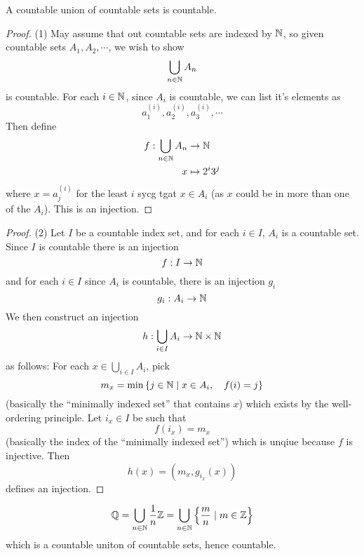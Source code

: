 \documentclass{article}
\begin{document}
\begin{nthm}\label{th:5-6}
    A countable union of countable sets is countable.
\end{nthm}
\begin{proof} (1)
    May assume that out countable sets are indexed by $\mathbb{N}$,
    so given countable sets $A_1, A_2, \cdots$, we wish to show
    \[
        \bigcup_{n \in \mathbb{N}} A_n  
    \]
    is countable.
    For each $i \in \mathbb{N}$, since $A_i$ is countable, we can list it's elements as
    \[
        a_1^{(i)}, a_2^{(i)}, a_3^{(i)}, \cdots  
    \]
    Then define 
    \begin{align*}
        f : \bigcup_{n \in \mathbb{N}} A_n & \rightarrow \mathbb{N} \\
        x &\mapsto 2^i 3^j
    \end{align*}
    where $x = a_j^{(i)}$ for the least $i$ sycg tgat $x \in A_i$ (as $x$ could be in more than one of the $A_i$). This is an injection.
\end{proof}
\begin{proof} (2)
    Let $I$ be a countable index set, and for each $i \in I$, $A_i$ is a countable set.
    Since $I$ is countable there is an injection
    \[
        f: I \rightarrow \mathbb{N}  
    \]
    and for each $i \in I$ since $A_i$ is countable, there is an injection $g_i$
    \[
        g_i: A_i \rightarrow \mathbb{N}  
    \]
    We then construct an injection
    \[
        h: \bigcup_{i \in I} A_i \rightarrow \mathbb{N} \times \mathbb{N}
    \]
    as follows:
    For each $x \in \bigcup_{i \in I} A_i$, pick 
    \[
        m_x = \min \left\{ j \in \mathbb{N} \mid x \in A_i, \quad f(i) = j \right\}  
    \]
    (basically the ``minimally indexed set'' that contains $x$) which exists by the well-ordering principle.
    Let $i_x \in I$ be such that 
    \[
        f(i_x) = m_x  
    \]
    (basically the index of the ``minimally indexed set'') which is unqiue because $f$ is injective.
    Then
    \[
        h(x) = (m_x, g_{i_x}(x))  
    \]
    defines an injection.
\end{proof}
\begin{eg}
    \[
        \mathbb{Q} = \bigcup_{n \in \mathbb{N}} \frac{1}{n} \mathbb{Z} = \bigcup_{n \in \mathbb{N}}\left\{ \frac{m}{n} \mid m \in \mathbb{Z} \right\}  
    \]
    which is a countable uniton of countable sets, hence countable.
\end{eg}
\end{document}
